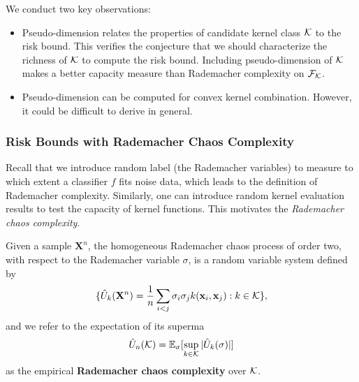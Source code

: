 
\begin{remark} \label{rmk:psdim}
We conduct two key observations:
\begin{itemize}
    \item Pseudo-dimension relates the properties of candidate kernel class ${\cal K}$ to the risk
    bound. This verifies the conjecture that we should characterize the richness of
    ${\cal K}$ to compute the risk bound. Including pseudo-dimension of ${\cal K}$ makes a
    better capacity measure than Rademacher complexity on ${\cal F}_{\cal K}$.
    \item Pseudo-dimension can be computed for convex kernel combination. However, it
     could be difficult to derive in general.
\end{itemize}
\end{remark}

\subsubsection{Risk Bounds with Rademacher Chaos Complexity}

Recall that we introduce random label (the Rademacher variables) to
measure to which extent a classifier $f$ fits noise data, which leads to the
definition of Rademacher complexity. Similarly, one can introduce random
kernel evaluation results to test the capacity of kernel functions. This
motivates the {\em Rademacher chaos complexity}.

\begin{definition} \cite{colt/YingC09}
Given a sample $\mathbf X^n$, the homogeneous Rademacher chaos process of order
two, with respect to the Rademacher variable $\sigma$, is a random variable system
defined by
\[
\{ \hat{U}_k(\mathbf X^n) = \frac{1}{n} \sum_{i < j} \sigma_i\sigma_jk(\mathbf{x}_i, \mathbf{x}_j): k \in {\cal K} \},
\]
and we refer to the expectation of its superma
\[
\hat{U}_n({\cal K}) = {\mathbb E}_{\sigma}[\sup_{k \in {\cal K}}|\hat{U}_k(\sigma)|]
\]
as the empirical {\bf Rademacher chaos complexity} over ${\cal K}$.
\end{definition}

